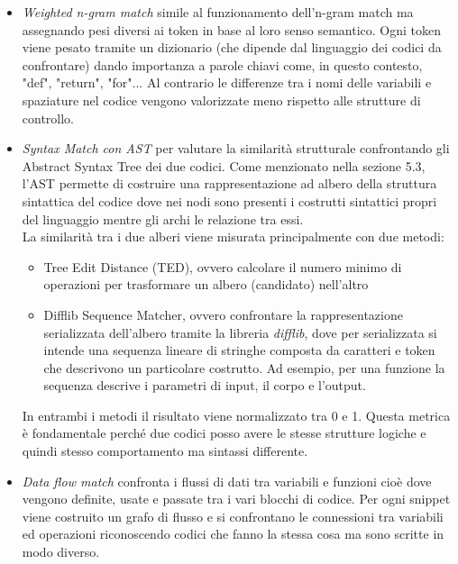 \documentclass{article}
\begin{document}
\begin{itemize}
\begin{itemize}
        \item \textit{Weighted n-gram match} simile al funzionamento dell'n-gram match ma assegnando pesi diversi ai token in base al loro senso semantico. Ogni token viene pesato tramite un dizionario (che dipende dal linguaggio dei codici da confrontare) dando importanza a parole chiavi come, in questo contesto, "def", "return", "for"...
        Al contrario le differenze tra i nomi delle variabili e spaziature nel codice vengono valorizzate meno rispetto alle strutture di controllo.

        \item \textit{Syntax Match con AST} per valutare la similarità strutturale confrontando gli Abstract Syntax Tree dei due codici. Come menzionato nella sezione 5.3, l'AST permette di costruire una rappresentazione ad albero della struttura sintattica del codice dove nei nodi sono presenti i costrutti sintattici propri del linguaggio mentre gli archi le relazione tra essi.\\
        La similarità tra i due alberi viene misurata principalmente con due metodi:
        \begin{itemize}
            \item Tree Edit Distance (TED), ovvero calcolare il numero minimo di operazioni per trasformare un albero (candidato) nell’altro
            \item Difflib Sequence Matcher, ovvero confrontare la rappresentazione serializzata dell'albero tramite la libreria \textit{difflib}, dove per serializzata si intende una sequenza lineare di stringhe composta da caratteri e token che descrivono un particolare costrutto. Ad esempio, per una funzione la sequenza descrive i parametri di input, il corpo e l'output.
        \end{itemize}
        In entrambi i metodi il risultato viene normalizzato tra 0 e 1. Questa metrica è fondamentale perché due codici posso avere le stesse strutture logiche e quindi stesso comportamento ma sintassi differente.

        \item \textit{Data flow match} confronta i flussi di dati tra variabili e funzioni cioè dove vengono definite, usate e passate tra i vari blocchi di codice. Per ogni snippet viene costruito un grafo di flusso e si confrontano le connessioni tra variabili ed operazioni riconoscendo codici che fanno la stessa cosa ma sono scritte in modo diverso.
        

\end{itemize}
\end{itemize}
\end{document}
